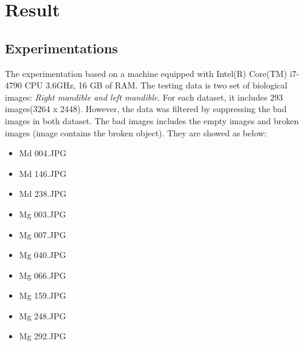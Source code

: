\chapter{Result}
\section{Experimentations}
The experimentation based on a machine equipped with Intel(R) Core(TM) i7-4790 CPU 3.6GHz, 16 GB of RAM. The testing data is two set of biological images: \textit{Right mandible and left mandible}. For each dataset, it includes 293 images(3264 x 2448). However, the data was filtered by suppressing the bad images in both dataset. The bad images includes the empty images and broken images (image contains the broken object). They are showed as below:
\begin{multicols}{3}
\begin{itemize}
\item Md 004.JPG
\item Md 146.JPG
\item Md 238.JPG
\item Mg 003.JPG
\item Mg 007.JPG
\item Mg 040.JPG
\item Mg 066.JPG
\item Mg 159.JPG
\item Mg 248.JPG
\item Mg 292.JPG
\end{itemize} 
\end{multicols}
